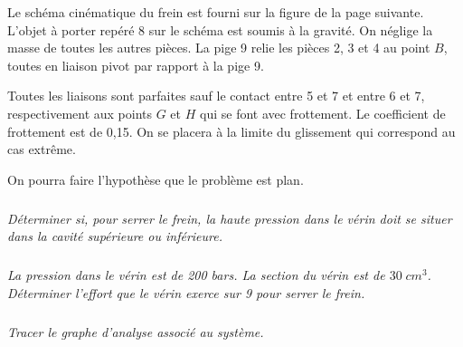 \documentclass[10pt]{article}
\begin{document}
Le schéma cinématique du frein est fourni sur la figure de la page suivante. L'objet à porter repéré 8 sur le schéma est soumis à la gravité. On néglige la masse de toutes les autres pièces. La pige 9 relie les pièces 2, 3 et 4 au point $B$, toutes en liaison pivot par rapport à la pige 9. 

Toutes les liaisons sont parfaites sauf le contact entre 5 et 7 et entre 6 et 7, respectivement aux points $G$ et $H$ qui se font avec frottement. Le coefficient de frottement est de 0,15. On se placera à la limite du glissement qui correspond au cas extrême.

On pourra faire l'hypothèse que le problème est plan.

\subparagraph{}
\textit{Déterminer si, pour serrer le frein, la haute pression dans le vérin doit se situer dans la cavité supérieure ou inférieure.}

\subparagraph{}
\textit{La pression dans le vérin est de 200 bars. La section du vérin est de $30\; cm^3$. Déterminer l'effort que le vérin exerce sur 9 pour serrer le frein.}

\subparagraph{}
\textit{Tracer le graphe d'analyse associé au système.}
\end{document}
